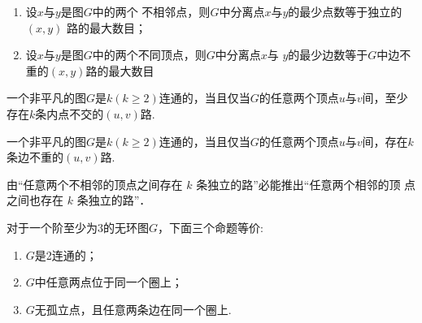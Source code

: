 \begin{theorem}[敏格尔1902---1985]
	\begin{enumerate}
		\item 设$x$与$y$是图$G$中的两个
		不相邻点，则$G$中分离点$x$与$y$的最少点数等于独立的$(x, y)$
		路的最大数目；
		\item 设$x$与$y$是图$G$中的两个不同顶点，则$G$中分离点$x$与
		$y$的最少边数等于$G$中边不重的$(x, y)$路的最大数目
	\end{enumerate}
\end{theorem}


\begin{theorem}[惠特尼1932]
一个非平凡的图$G$是$k (k\geq 2)$连通的，当且仅当$G$的任意两个顶点$u$与$v$间，至少存在$k$条内点不交的$(u ,v)$路.
\end{theorem}


\begin{theorem}[惠特尼1932]
	一个非平凡的图$G$是$k (k\geq 2)$连通的，当且仅当$G$的任意两个顶点$u$与$v$间，存在$k$条边不重的$(u ,v)$路.
\end{theorem}
\begin{note}
	由“任意两个不相邻的顶点之间存在 $k$ 条独立的路”必能推出“任意两个相邻的顶
	点之间也存在 $k$ 条独立的路”．
\end{note}

\begin{corollary}
	对于一个阶至少为3的无环图$G$，下面三个命题等价:
	\begin{enumerate}
	\item $G$是2连通的；
	\item $G$中任意两点位于同一个圈上；
	\item $G$无孤立点，且任意两条边在同一个圈上.
\end{enumerate}
\end{corollary}






